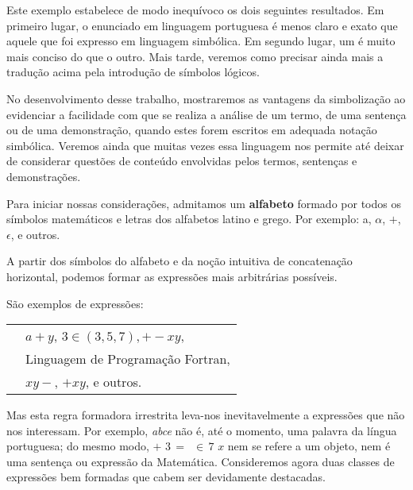     \vspace{-1\baselineskip} %

    \begin{center}
        \noindent\texttt{}
    \end{center}

\endgroup

\newpage

Este exemplo estabelece de modo inequívoco os dois seguintes resultados.
Em primeiro lugar, o enunciado em linguagem portuguesa é menos claro e exato que aquele que foi expresso em linguagem simbólica.
Em segundo lugar, um é muito mais conciso do que o outro.
Mais tarde, veremos como precisar ainda mais a tradução acima pela introdução de símbolos lógicos.

No desenvolvimento desse trabalho, mostraremos as vantagens da simbolização ao evidenciar a facilidade com que se realiza a análise de um termo, de uma sentença ou de uma demonstração, quando estes forem escritos em adequada notação simbólica.
Veremos ainda que muitas vezes essa linguagem nos permite até deixar de considerar questões de conteúdo envolvidas pelos termos, sentenças e demonstrações.

Para iniciar nossas considerações, admitamos um \textbf{alfabeto} formado por todos os símbolos matemáticos e letras dos alfabetos latino e grego.
Por exemplo: a, $\alpha$, $+$, $\epsilon$, e outros.

A partir dos símbolos do alfabeto e da noção intuitiva de concatenação horizontal, podemos formar as expressões mais arbitrárias possíveis.

São exemplos de expressões:

\begin{center}
    \begin{tabular}{l l}
        & $a + y$, $3 \in (3, 5, 7), +-xy$,\\

        & Linguagem de Programação Fortran,\\

        & $xy-$, $+xy$, e outros.
    \end{tabular}
\end{center}

\newpage

Mas esta regra formadora irrestrita leva-nos inevitavelmente a expressões que não nos interessam.
Por exemplo, \textit{abce} não é, até o momento, uma palavra da língua portuguesa; do mesmo modo, $+\,\, 3 \,=\,\,\, \in\, 7\,\, x$ nem se refere a um objeto, nem é uma sentença ou expressão da Matemática.
Consideremos agora duas classes de expressões bem formadas que cabem ser devidamente destacadas.

